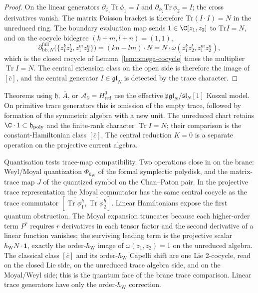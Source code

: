 \documentclass[11pt]{memoir}
\begin{document}
\begin{proof}
  On the linear generators
  $\partial_{\phi_1}\mathrm{Tr}\,\phi_1=I$ and
  $\partial_{\phi_2}\mathrm{Tr}\,\phi_2=I$; the cross derivatives
  vanish.  The matrix Poisson bracket is therefore
  $\mathrm{Tr}(I\cdot I)=N$ in the unreduced ring.  The boundary evaluation map sends
  $1\in\C[z_1,z_2]$ to $\mathrm{Tr}I=N$, and on the cocycle bidegree
  $(k+m,l+n)=(1,1)$,
  $$\partial_{\mathrm{bb},N}^{\mathrm{full}}\bigl(\{z_1^kz_2^l,
    z_1^mz_2^n\}\bigr)
    =(kn-lm)\cdot N=N\cdot\omega(z_1^kz_2^l,z_1^mz_2^n),$$
  which is the closed cocycle of Lemma~\ref{lem:omega-cocycle} times
  the multiplier $\operatorname{Tr}I=N$.  The central extension class on
  the open side is therefore the image of $[\bar c]$, and the central
  generator $I\in\mathfrak{gl}_N$ is detected by the trace character.
\end{proof}

\begin{rmk}\label{rmk:quotient-discipline-flag}
  Theorems using $\mathfrak h$, $\bar A$, or
  $\mathcal A_{\partial}=H^0_{\mathrm{red}}$ use the effective
  \(\mathfrak{pgl}_N/\mathfrak{sl}_N[1]\) Koszul model.  On primitive
  trace generators this is omission of the empty trace, followed by
  formation of the symmetric algebra with a new unit.  The unreduced
  chart retains $\C\cdot1\subset\mathfrak h_{\mathrm{poly}}$ and the
  finite-rank character $\operatorname{Tr}I=N$; their comparison is the
  constant-Hamiltonian class $[\bar c]$.  The central reduction \(K=0\)
  is a separate operation on the projective current algebra.
\end{rmk}

Quantisation tests trace-map compatibility.  Two operations close
in on the brane: Weyl/Moyal quantization
\(\Phi_{\hbar_{\mathrm{W}}}\) of the formal
symplectic polydisk, and the matrix-trace map \(J\) of the
quantized symbol on the Chan--Paton pair.  In the projective trace
representation the Moyal commutator has the same central cocycle as the trace commutator
\([\overline{\operatorname{Tr}\phi_1^\hbar},
\overline{\operatorname{Tr}\phi_2^\hbar}]\).  Linear Hamiltonians
expose the first quantum obstruction.  The Moyal expansion truncates
because each higher-order term \(P^r\) requires \(r\) derivatives in
each tensor factor and the second derivative of a linear function
vanishes; the surviving leading term is the projective scalar
\(\hbar_{\mathrm{W}}N\cdot\mathbf 1\), exactly the order-\(\hbar_{\mathrm{W}}\) image of
\(\omega(z_1,z_2)=1\) on the unreduced algebra.  The classical class \([\bar c]\) and its order-\(\hbar_{\mathrm{W}}\)
Capelli shift are one Lie 2-cocycle, read on the closed Lie side, on
the unreduced trace algebra side, and on the Moyal/Weyl side; this is
the quantum face of the brane trace comparison. Linear trace generators have
only the order-\(\hbar_{\mathrm{W}}\) correction.
\end{document}
